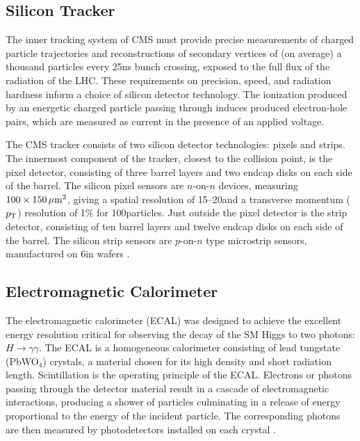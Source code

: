 \subsection{Silicon Tracker}
The inner tracking system of CMS must provide precise measurements of charged particle trajectories and reconstructions of secondary vertices of (on average) a thousand particles every 25\unit{ns} bunch crossing, exposed to the full flux of the radiation of the LHC.
These requirements on precision, speed, and radiation hardness inform a choice of silicon detector technology.
The ionization produced by an energetic charged particle passing through induces produced electron-hole pairs, which are measured as current in the presence of an applied voltage.

The CMS tracker consists of two silicon detector technologies: pixels and strips.
The innermost component of the tracker, closest to the collision point, is the pixel detector, consisting of three barrel layers and two endcap disks on each side of the barrel.
The silicon pixel sensors are $n$-on-$n$ devices, measuring $100 \times 150 \,\mu\text{m}^2$, giving a spatial resolution of 15--20\mum and a transverse momentum ($p_{\mathrm{T}}$) resolution of 1\% for 100\GeV particles.
Just outside the pixel detector is the strip detector, consisting of ten barrel layers and twelve endcap disks on each side of the barrel.
The silicon strip sensors are $p$-on-$n$ type microstrip sensors, manufactured on 6\unit{in} wafers \cite{Chatrchyan:2008zzk, CERN-LHCC-98-006, HARTMANN201225}.


\subsection{Electromagnetic Calorimeter}
The electromagnetic calorimeter (ECAL) was designed to achieve the excellent energy resolution critical for observing the decay of the SM Higgs to two photons: $H \to \gamma\gamma$.
The ECAL is a homogeneous calorimeter consisting of lead tungstate (PbWO$_4$) crystals, a material chosen for its high density and short radiation length.
Scintillation is the operating principle of the ECAL.
Electrons or photons passing through the detector material result in a cascade of electromagnetic interactions, producing a shower of particles culminating in a release of energy proportional to the energy of the incident particle.
The corresponding photons are then measured by photodetectors installed on each crystal \cite{Chatrchyan:2008zzk, CERN-LHCC-97-033, Fabjan:692252}.

